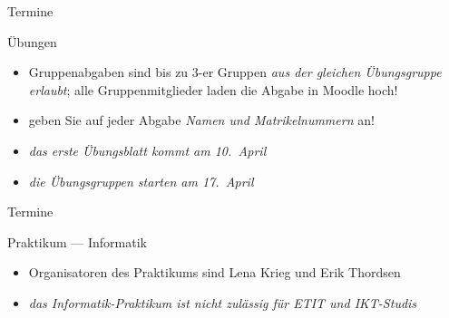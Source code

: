 \documentclass[aspectratio=1610, 11pt]{beamer}
\begin{document}
\begin{frame}{Termine}
	\begin{exampleblock}{\"Ubungen}
		\begin{itemize}
			\item Gruppenabgaben sind bis zu 3-er Gruppen \emph{aus der gleichen \"Ubungsgruppe erlaubt}; alle Gruppenmitglieder laden die Abgabe in Moodle hoch!
			\item geben Sie auf jeder Abgabe \emph{Namen und Matrikelnummern} an!
			\item \emph{das erste \"Ubungsblatt kommt am 10.~April}
			\item \emph{die \"Ubungsgruppen starten am 17.~April}
		\end{itemize}
	\end{exampleblock}
\end{frame}

\begin{frame}{Termine}
	\begin{exampleblock}{Praktikum --- Informatik}
		\begin{itemize}
			\item Organisatoren des Praktikums sind Lena Krieg und Erik Thordsen
			\item \emph{das Informatik-Praktikum ist nicht zul\"assig f\"ur ETIT und IKT-Studis}
		\end{itemize}
	\end{exampleblock}
\end{frame}
\end{document}
